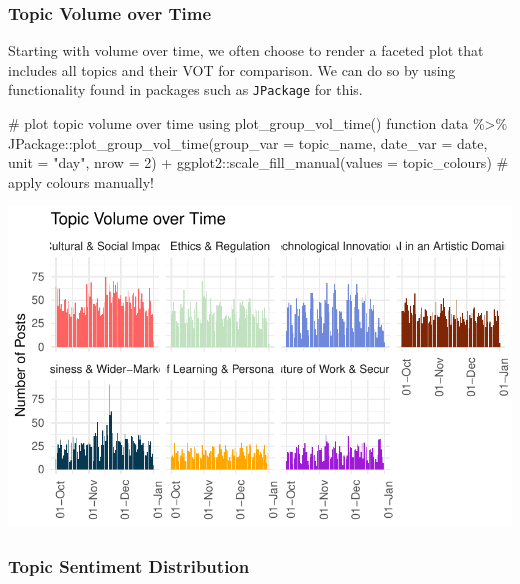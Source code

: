 \documentclass[
  letterpaper,
  DIV=11,
  numbers=noendperiod]{scrreprt}
\newenvironment{Shaded}{\begin{snugshade}}{\end{snugshade}}
\newcommand{\AttributeTok}[1]{\textcolor[rgb]{0.40,0.45,0.13}{#1}}
\newcommand{\CommentTok}[1]{\textcolor[rgb]{0.37,0.37,0.37}{#1}}
\newcommand{\DecValTok}[1]{\textcolor[rgb]{0.68,0.00,0.00}{#1}}
\newcommand{\FunctionTok}[1]{\textcolor[rgb]{0.28,0.35,0.67}{#1}}
\newcommand{\NormalTok}[1]{\textcolor[rgb]{0.00,0.23,0.31}{#1}}
\newcommand{\SpecialCharTok}[1]{\textcolor[rgb]{0.37,0.37,0.37}{#1}}
\newcommand{\StringTok}[1]{\textcolor[rgb]{0.13,0.47,0.30}{#1}}
\begin{document}
\subsubsection{Topic Volume over Time}\label{topic-volume-over-time}

Starting with volume over time, we often choose to render a faceted plot
that includes all topics and their VOT for comparison. We can do so by
using functionality found in packages such as \texttt{JPackage} for
this.

\begin{Shaded}
\begin{Highlighting}[]
\CommentTok{\# plot topic volume over time using \textquotesingle{}plot\_group\_vol\_time()\textquotesingle{} function}
\NormalTok{data }\SpecialCharTok{\%\textgreater{}\%} 
\NormalTok{  JPackage}\SpecialCharTok{::}\FunctionTok{plot\_group\_vol\_time}\NormalTok{(}\AttributeTok{group\_var =}\NormalTok{ topic\_name,}
                                \AttributeTok{date\_var =}\NormalTok{ date,}
                                \AttributeTok{unit =} \StringTok{"day"}\NormalTok{,}
                                \AttributeTok{nrow =} \DecValTok{2}\NormalTok{) }\SpecialCharTok{+}
\NormalTok{  ggplot2}\SpecialCharTok{::}\FunctionTok{scale\_fill\_manual}\NormalTok{(}\AttributeTok{values =}\NormalTok{ topic\_colours) }\CommentTok{\# apply colours manually!}
\end{Highlighting}
\end{Shaded}

\includegraphics{conversation_landscape_files/figure-pdf/unnamed-chunk-7-1.pdf}

\subsubsection{Topic Sentiment
Distribution}\label{topic-sentiment-distribution}
\end{document}
